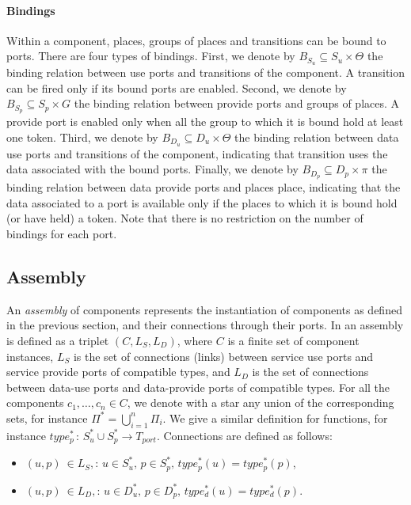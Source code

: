 \paragraph{Bindings}{

  Within a \mad component, places, groups of places and transitions
  can be bound to ports. There are four types of bindings.  First, we
  denote by $B_{S_{u}} \subseteq S_u \times \Theta$ the binding
  relation between use ports and transitions of the component. A
  transition can be fired only if its bound ports are enabled. Second,
  we denote by $B_{S_{p}} \subseteq S_p \times G$ the binding relation
  between provide ports and groups of places. A provide port is
  enabled only when all the group to which it is bound hold at least
  one token. Third, we denote by $B_{D_{u}} \subseteq D_u \times
  \Theta$ the binding relation between data use ports and transitions
  of the component, indicating that transition uses the data
  associated with the bound ports. Finally, we denote by $B_{D_{p}}
  \subseteq D_p \times \pi$ the binding relation between data provide
  ports and places place, indicating that the data associated to a
  port is available only if the places to which it is bound hold (or
  have held) a token. Note that there is no restriction on the number
  of bindings for each port.}

\subsection{Assembly}

An \emph{assembly} of components represents the instantiation of
components as defined in the previous section, and their connections
through their ports. In \mad an assembly is defined as a triplet
$(C, L_S, L_D)$, where $C$ is a finite set of component instances,
$L_S$ is the set of connections (links) between service use ports and
service provide ports of compatible types, and $L_D$ is the set of
connections between data-use ports and data-provide ports of
compatible types. For all the components $c_1,\dots,c_n \in C$, we
denote with a star any union of the corresponding sets, for instance
$\Pi^*=\bigcup_{i=1}^{n}\Pi_{i}$. We give a similar definition
for functions, for instance
$type_{p}^*\,:\,S_{u}^*\cup S_{p}^*\rightarrow T_{port}$. Connections
are defined as follows:

\begin{itemize}
\item $\left(u,p\right)\ \in L_S,:\,u\in S_{u}^{*},\,p\in S_{p}^{*},\,type_{p}^{*}\left(u\right)=type_{p}^{*}\left(p\right)$,
\item $\left(u,p\right)\ \in L_D,:\,u\in D_{u}^{*},\,p\in D_{p}^{*},\,type_{d}^{*}\left(u\right)=type_{d}^{*}\left(p\right)$.
\end{itemize}

